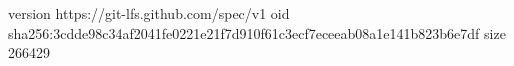 version https://git-lfs.github.com/spec/v1
oid sha256:3cdde98c34af2041fe0221e21f7d910f61c3ecf7eceeab08a1e141b823b6e7df
size 266429
